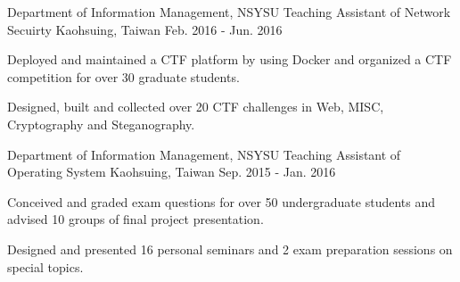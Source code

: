 \begin{cventries}

\cventry
{Department of Information Management, NSYSU} %
{Teaching Assistant of Network Secuirty} %
{Kaohsuing, Taiwan} %
{Feb. 2016 - Jun. 2016} %
{ %
\begin{cvitems}
\item {Deployed and maintained a CTF platform by using Docker and organized a CTF competition for over 30 graduate students.}
\item {Designed, built and collected over 20 CTF challenges in Web, MISC, Cryptography and Steganography.}
\end{cvitems}
}


\cventry
{Department of Information Management, NSYSU} %
{Teaching Assistant of Operating System} %
{Kaohsuing, Taiwan} %
{Sep. 2015 - Jan. 2016} %
{ %
\begin{cvitems}
\item {Conceived and graded exam questions for over 50 undergraduate students and advised 10 groups of final project presentation.}
\item {Designed and presented 16 personal seminars and 2 exam preparation sessions on special topics.}
\end{cvitems}
}

\end{cventries}
